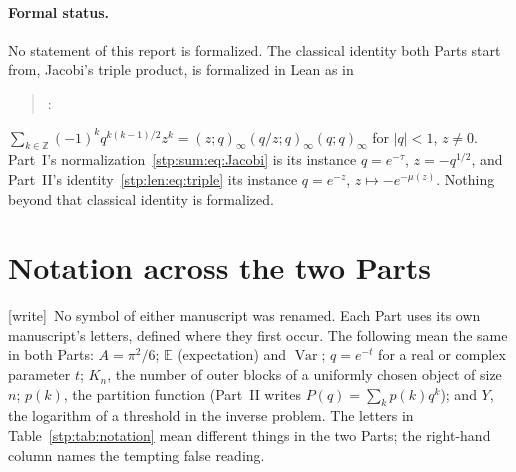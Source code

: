 \documentclass[11pt]{article}
\theoremstyle{remark}\newtheorem{remark}[theorem]{Remark}
\newcommand{\E}{\mathbb E}
\newcommand{\Z}{\mathbb Z}
\DeclareMathOperator{\Var}{Var}
\newcommand{\wtag}{\textup{[write]}}
\begin{document}
\paragraph{Formal status.} No statement of this report is formalized. The
classical identity both Parts start from, Jacobi's triple product, is
formalized in Lean as  in
\begin{quote}\small
{}:
\end{quote}
$\sum_{k\in\Z}(-1)^kq^{k(k-1)/2}z^k=(z;q)_\infty(q/z;q)_\infty(q;q)_\infty$
for $|q|<1$, $z\ne0$. Part~I's normalization~\eqref{stp:sum:eq:Jacobi} is its
instance $q=e^{-\tau}$, $z=-q^{1/2}$, and Part~II's identity~\eqref{stp:len:eq:triple}
its instance $q=e^{-z}$, $z\mapsto-e^{-\mu(z)}$. Nothing beyond that classical
identity is formalized.

\section{Notation across the two Parts}\label{stp:sec:notation}

\wtag\ No symbol of either manuscript was renamed. Each Part uses its own
manuscript's letters, defined where they first occur. The following mean the
same in both Parts: $A=\pi^2/6$; $\E$ (expectation) and $\Var$; $q=e^{-t}$
for a real or complex parameter $t$; $K_n$, the number of outer blocks of a
uniformly chosen object of size $n$; $p(k)$, the partition function (Part~II
writes $P(q)=\sum_kp(k)q^k$); and $Y$, the logarithm of a threshold in the
inverse problem. The letters in Table~\ref{stp:tab:notation} mean different
things in the two Parts; the right-hand column names the tempting false
reading.
\end{document}
